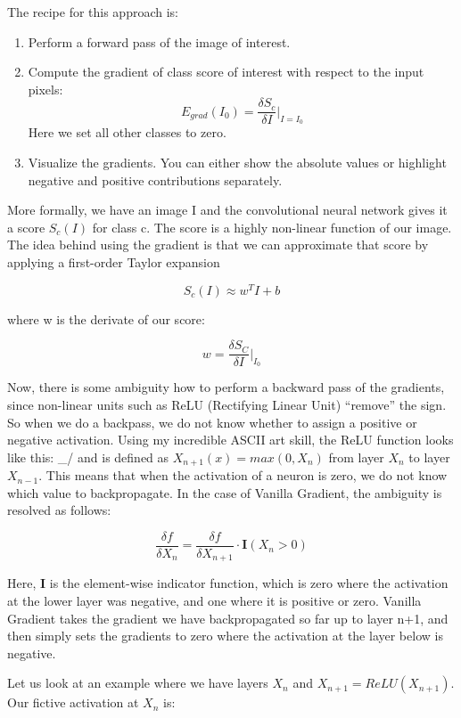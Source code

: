 \documentclass[
  10pt,
]{scrbook}
\providecommand{\tightlist}{%
  \setlength{\itemsep}{0pt}\setlength{\parskip}{0pt}}
\begin{document}
The recipe for this approach is:

\begin{enumerate}
\def\labelenumi{\arabic{enumi}.}
\tightlist
\item
  Perform a forward pass of the image of interest.
\item
  Compute the gradient of class score of interest with respect to the input pixels:
  \[E_{grad}(I_0)=\frac{\delta{}S_c}{\delta{}I}|_{I=I_0}\]
  Here we set all other classes to zero.
\item
  Visualize the gradients. You can either show the absolute values or highlight negative and positive contributions separately.
\end{enumerate}

More formally, we have an image I and the convolutional neural network gives it a score \(S_c(I)\) for class c.
The score is a highly non-linear function of our image.
The idea behind using the gradient is that we can approximate that score by applying a first-order Taylor expansion

\[S_c(I)\approx{}w^T{}I+b\]

where w is the derivate of our score:

\[w = \frac{\delta S_C}{\delta I}|_{I_0}\]

Now, there is some ambiguity how to perform a backward pass of the gradients, since non-linear units such as ReLU (Rectifying Linear Unit) ``remove'' the sign.
So when we do a backpass, we do not know whether to assign a positive or negative activation.
Using my incredible ASCII art skill, the ReLU function looks like this: \_/ and is defined as \(X_{n+1}(x)=max(0,X_n)\) from layer \(X_n\) to layer \(X_{n-1}\).
This means that when the activation of a neuron is zero, we do not know which value to backpropagate.
In the case of Vanilla Gradient, the ambiguity is resolved as follows:

\[\frac{\delta f}{\delta X_n} = \frac{\delta f}{\delta X_{n+1}} \cdot \mathbf{I}(X_n > 0)\]

Here, \(\mathbf{I}\) is the element-wise indicator function, which is zero where the activation at the lower layer was negative, and one where it is positive or zero.
Vanilla Gradient takes the gradient we have backpropagated so far up to layer n+1, and then simply sets the gradients to zero where the activation at the layer below is negative.

Let us look at an example where we have layers \(X_n\) and \(X_{n+1}=ReLU(X_{n+1})\).
Our fictive activation at \(X_n\) is:
\end{document}
